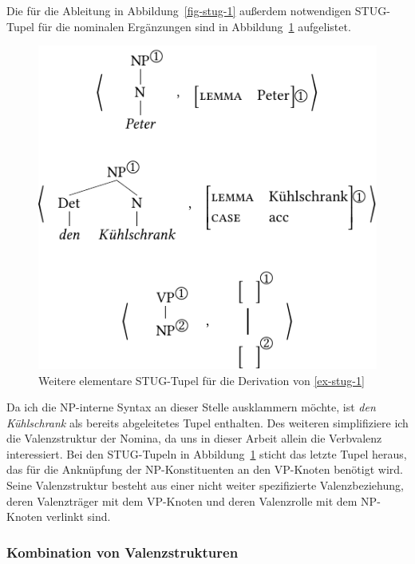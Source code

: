 Die für die Ableitung in Abbildung~\ref{fig-stug-1} au\ss erdem notwendigen STUG-Tupel für die nominalen Ergänzungen sind in Abbildung~\ref{fig-stug-3} aufgelistet.
\begin{figure}[t]
\centering
\includegraphics{graphics/abb93.pdf}
\caption{\label{fig-stug-3}Weitere elementare STUG-Tupel für die Derivation von \ref{ex-stug-1}}
\end{figure}
Da ich die NP-interne Syntax an dieser Stelle ausklammern möchte, ist {\it den Kühlschrank} als bereits abgeleitetes Tupel enthalten. Des weiteren simplifiziere ich die Valenzstruktur der Nomina, da uns in dieser Arbeit allein die Verbvalenz interessiert. Bei den STUG-Tupeln in Abbildung~\ref{fig-stug-3} sticht das letzte Tupel heraus, das für die Anknüpfung der NP-Konstituenten an den VP-Knoten benötigt wird. Seine Valenzstruktur besteht aus einer nicht weiter spezifizierte Valenzbeziehung, deren Valenzträger mit dem VP-Knoten und deren Valenzrolle mit dem NP-Knoten verlinkt sind.

\subsubsection*{Kombination von Valenzstrukturen}    

